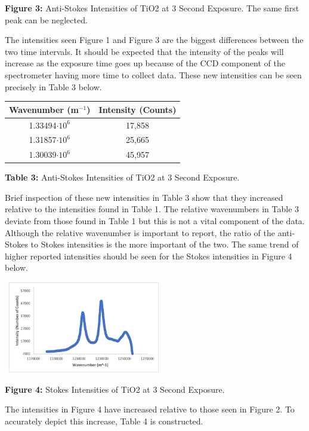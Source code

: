 \documentclass[12pt]{article}
\begin{document}
\begin{multicols}{2}
\begin{center}
    \caption{\textbf{\small{Figure 3:}} \small{Anti-Stokes Intensities of TiO2 at 3 Second Exposure. The same first peak can be neglected.}}
\end{center}
The intensities seen Figure 1 and Figure 3 are the biggest differences between the two time intervals. It should be expected that the intensity of the peaks will increase as the exposure time goes up because of the CCD component of the spectrometer having more time to collect data. These new intensities can be seen precisely in Table 3 below.
\newline
\begin{tabular}{|c|c|}
    \hline \textbf{Wavenumber (m$^{-1}$)} & \textbf{Intensity (Counts)} \\ \hline
    1.33494$\cdot10^6$ & 17,858 \\ \hline
    1.31857$\cdot10^6$ & 25,665 \\ \hline
    1.30039$\cdot10^6$ & 45,957 \\ \hline
\end{tabular}
\centerline{\tiny\textbf{{Table 3:}} \tiny{Anti-Stokes Intensities of TiO2 at 3 Second Exposure.}}
\newline
Brief inspection of these new intensities in Table 3 show that they increased relative to the intensities found in Table 1. The relative wavenumbers in Table 3 deviate from those found in Table 1 but this is not a vital component of the data. Although the relative wavenumber is important to report, the ratio of the anti-Stokes to Stokes intensities is the more important of the two. The same trend of higher reported intensities should be seen for the Stokes intensities in Figure 4 below.
\begin{center}
    \includegraphics[width=7cm, height=4cm]{PHYS 331 RS TiO2 Stokes Wavnumber (3 Sec).png}
    \caption{\textbf{\small{Figure 4:}} \small{Stokes Intensities of TiO2 at 3 Second Exposure.}}
\end{center}
The intensities in Figure 4 have increased relative to those seen in Figure 2. To accurately depict this increase, Table 4 is constructed.

\end{multicols}
\end{document}
